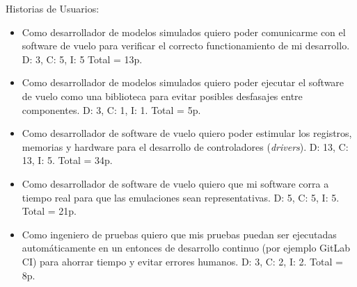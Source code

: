 Historias de Usuarios:

\begin{itemize}
\item Como desarrollador de modelos simulados quiero poder comunicarme con el software de vuelo para verificar el correcto functionamiento de mi desarrollo. D: 3, C: 5, I: 5 Total = 13p.

\item Como desarrollador de modelos simulados quiero poder ejecutar el software de vuelo como una biblioteca para evitar posibles desfasajes entre componentes. D: 3, C: 1, I: 1. Total = 5p.

\item Como desarrollador de software de vuelo quiero poder estimular los registros, memorias y hardware para el desarrollo de controladores (\textit{drivers}). D: 13, C: 13, I: 5. Total = 34p.

\item Como desarrollador de software de vuelo quiero que mi software corra a tiempo real para que las emulaciones sean representativas. D: 5, C: 5, I: 5. Total = 21p.

\item Como ingeniero de pruebas quiero que mis pruebas puedan ser ejecutadas automáticamente en un entonces de desarrollo continuo (por ejemplo GitLab CI) para ahorrar tiempo y evitar errores humanos. D: 3, C: 2, I: 2. Total = 8p.
\end{itemize}
